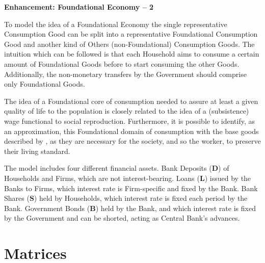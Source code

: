 \documentclass[a4paper, headings=standardclasses]{scrartcl}
\numberwithin{equation}{subsection}
\newenvironment{enh}[1][]{\begin{framed}\noindent\textbf{Enhancement: #1}\par}{\end{framed}}
\begin{document}
\begin{enh}[Foundational Economy -- 2]
    To model the idea of a Foundational Economy the single representative Consumption Good can be split into a representative Foundational Consumption Good and another kind of Others (non-Foundational) Consumption Goods.
    The intuition which can be followed is that each Household aims to consume a certain amount of Foundational Goods before to start consuming the other Goods. Additionally, the non-monetary transfers by the Government should comprise only Foundational Goods.

    The idea of a Foundational core of consumption needed to assure at least a given quality of life to the population is closely related to the idea of a (subsistence) wage functional to social reproduction.
    Furthermore, it is possible to identify, as an approximation, this Foundational domain of consumption with the base goods described by \textcite{sraffa1960}, as they are necessary for the society, and so the worker, to preserve their living standard.
\end{enh}

The model includes four different financial assets.
Bank Deposits ($\mathbf{D}$) of Households and Firms, which are not interest-bearing.
Loans ($\mathbf{L}$) issued by the Banks to Firms, which interest rate is Firm-specific and fixed by the Bank.
Bank Shares ($\mathbf{S}$) held by Households, which interest rate is fixed each period by the Bank.
Government Bonds ($\mathbf{B}$) held by the Bank, and which interest rate is fixed by the Government and can be shorted, acting as Central Bank's advances.

\section{Matrices}
\end{document}
